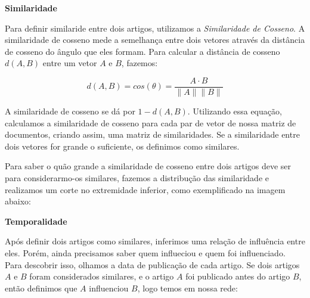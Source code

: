 \documentclass[a4paper,12pt]{article}
\begin{document}
 \begin{description}
  \item \textbf{Similaridade}
  
    Para definir similaride entre dois artigos, utilizamos a \textit{Similaridade de Cosseno}. A similaridade de cosseno mede a semelhança entre
    dois vetores através da distância de cosseno do ângulo que eles formam. Para calcular a distância de cosseno $d(A,B)$ entre um vetor $A$ e $B$, fazemos:
    
    \begin{equation}
      d(A,B) = cos(\theta) = \dfrac{A \cdot B}{\parallel A\parallel \parallel B \parallel}
    \end{equation}

    
    A similaridade de cosseno se dá por $1-d(A,B)$. Utilizando essa equação, calculamos a similaridade de cosseno para cada
    par de vetor de nossa matriz de documentos, criando assim, uma matriz de similaridades. Se a similaridade entre dois vetores for 
    grande o suficiente, os definimos como similares. 
    
    Para saber o quão grande a similaridade de cosseno entre dois artigos deve ser para considerarmo-os similares, fazemos a
    distribução das similaridade e realizamos um corte no extremidade inferior, como exemplificado na imagem abaixo:
    
    
    
    
  \item \textbf{Temporalidade}
  
    Após definir dois artigos como similares, inferimos uma relação de influência entre eles. Porém, ainda precisamos saber quem influeciou e quem
    foi influenciado. Para descobrir isso, olhamos a data de publicação de cada artigo. Se dois artigos $A$ e $B$ foram considerados 
    similares, e o artigo $A$ foi publicado antes do artigo $B$, então definimos que $A$ influenciou $B$, logo temos em nossa rede:
    

\end{description}
\end{document}
